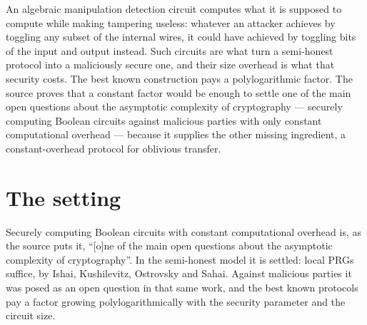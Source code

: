 \documentclass{aicr-conjecture}
\begin{document}

\vspace{0.4em}

\begin{informalconjecture}
An algebraic manipulation detection circuit computes what it is supposed
to compute while making tampering useless: whatever an attacker achieves
by toggling any subset of the internal wires, it could have achieved by
toggling bits of the input and output instead. Such circuits are what
turn a semi-honest protocol into a maliciously secure one, and their
size overhead is what that security costs. The best known construction
pays a polylogarithmic factor. The source proves that a constant factor
would be enough to settle one of the main open questions about the
asymptotic complexity of cryptography --- securely computing Boolean
circuits against malicious parties with only constant computational
overhead --- because it supplies the other missing ingredient, a
constant-overhead protocol for oblivious transfer.
\end{informalconjecture}

\section{The setting}\label{sec:setting}

Securely computing Boolean circuits with constant computational overhead
is, as the source puts it, ``[o]ne of the main open questions about the
asymptotic complexity of cryptography''. In the semi-honest model it is
settled: local PRGs suffice, by Ishai, Kushilevitz, Ostrovsky and
Sahai. Against malicious parties it was posed as an open question in that
same work, and the best known protocols pay a factor growing
polylogarithmically with the security parameter and the circuit size.
\end{document}
